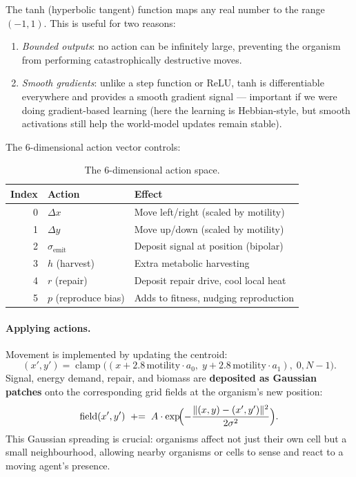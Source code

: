 \documentclass[12pt,a4paper]{article}
\DeclareMathOperator{\clamp}{clamp}
\begin{document}
\begin{tcolorbox}[intubox={Why tanh activation?}]
The tanh (hyperbolic tangent) function maps any real number
to the range $(-1, 1)$.
This is useful for two reasons:
\begin{enumerate}[nosep]
\item \emph{Bounded outputs}: no action can be infinitely large,
  preventing the organism from performing catastrophically
  destructive moves.
\item \emph{Smooth gradients}: unlike a step function or ReLU,
  tanh is differentiable everywhere and provides a smooth gradient
  signal — important if we were doing gradient-based learning
  (here the learning is Hebbian-style, but smooth activations
  still help the world-model updates remain stable).
\end{enumerate}
\end{tcolorbox}

The 6-dimensional action vector controls:

\begin{table}[h]
\centering
\renewcommand{\arraystretch}{1.2}
\begin{tabular}{rll}
\toprule
\textbf{Index} & \textbf{Action} & \textbf{Effect} \\
\midrule
0 & $\Delta x$ & Move left/right (scaled by motility) \\
1 & $\Delta y$ & Move up/down (scaled by motility) \\
2 & $\sigma_\text{emit}$ & Deposit signal at position (bipolar) \\
3 & $h$ (harvest) & Extra metabolic harvesting \\
4 & $r$ (repair) & Deposit repair drive, cool local heat \\
5 & $p$ (reproduce bias) & Adds to fitness, nudging reproduction \\
\bottomrule
\end{tabular}
\caption{The 6-dimensional action space.}
\end{table}

\paragraph{Applying actions.}
Movement is implemented by updating the centroid:
\[
  (x', y') = \clamp\!\bigl((x + 2.8\,\text{motility}\cdot a_0,\;
    y + 2.8\,\text{motility}\cdot a_1),\; 0, N-1\bigr).
\]
Signal, energy demand, repair, and biomass are
\textbf{deposited as Gaussian patches}
onto the corresponding grid fields at the organism's new position:
\[
  \text{field}(x',y') \;\mathrel{+}=\;
    A \cdot \exp\!\Bigl(-\frac{\|(x,y)-(x',y')\|^2}{2\sigma^2}\Bigr).
\]
This Gaussian spreading is crucial: organisms affect not just
their own cell but a small neighbourhood,
allowing nearby organisms or cells to sense and react
to a moving agent's presence.
\end{document}
